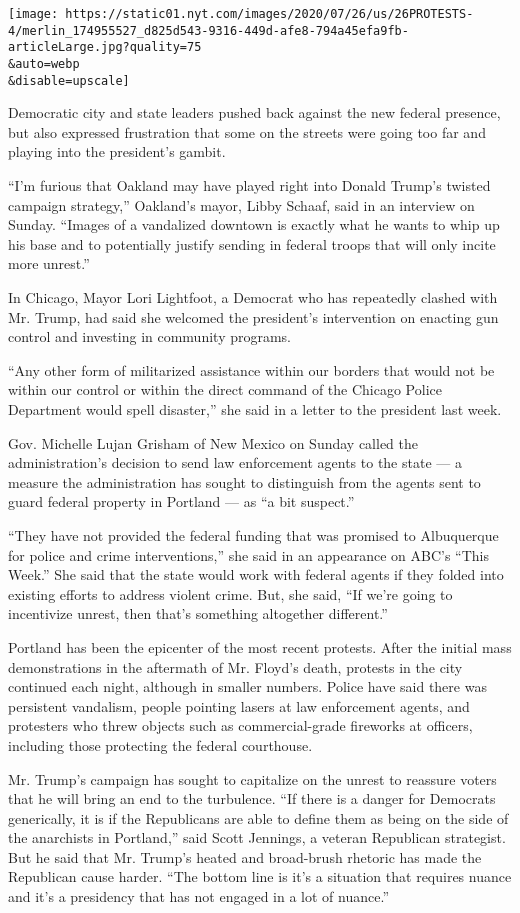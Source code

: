 \texttt{[image: https://static01.nyt.com/images/2020/07/26/us/26PROTESTS-4/merlin\_174955527\_d825d543-9316-449d-afe8-794a45efa9fb-articleLarge.jpg?quality=75\\\&auto=webp\\\&disable=upscale]}

Democratic city and state leaders pushed back against the new federal
presence, but also expressed frustration that some on the streets were
going too far and playing into the president's gambit.

``I'm furious that Oakland may have played right into Donald Trump's
twisted campaign strategy,'' Oakland's mayor, Libby Schaaf, said in an
interview on Sunday. ``Images of a vandalized downtown is exactly what
he wants to whip up his base and to potentially justify sending in
federal troops that will only incite more unrest.''

In Chicago, Mayor Lori Lightfoot, a Democrat who has repeatedly clashed
with Mr. Trump, had said she welcomed the president's intervention on
enacting gun control and investing in community programs.

``Any other form of militarized assistance within our borders that would
not be within our control or within the direct command of the Chicago
Police Department would spell disaster,'' she said in a letter to the
president last week.

Gov. Michelle Lujan Grisham of New Mexico on Sunday called the
administration's decision to send law enforcement agents to the state
--- a measure the administration has sought to distinguish from the
agents sent to guard federal property in Portland --- as ``a bit
suspect.''

``They have not provided the federal funding that was promised to
Albuquerque for police and crime interventions,'' she said in an
appearance on ABC's ``This Week.'' She said that the state would work
with federal agents if they folded into existing efforts to address
violent crime. But, she said, ``If we're going to incentivize unrest,
then that's something altogether different.''

Portland has been the epicenter of the most recent protests. After the
initial mass demonstrations in the aftermath of Mr. Floyd's death,
protests in the city continued each night, although in smaller numbers.
Police have said there was persistent vandalism, people pointing lasers
at law enforcement agents, and protesters who threw objects such as
commercial-grade fireworks at officers, including those protecting the
federal courthouse.

Mr. Trump's campaign has sought to capitalize on the unrest to reassure
voters that he will bring an end to the turbulence. ``If there is a
danger for Democrats generically, it is if the Republicans are able to
define them as being on the side of the anarchists in Portland,'' said
Scott Jennings, a veteran Republican strategist. But he said that Mr.
Trump's heated and broad-brush rhetoric has made the Republican cause
harder. ``The bottom line is it's a situation that requires nuance and
it's a presidency that has not engaged in a lot of nuance.''

